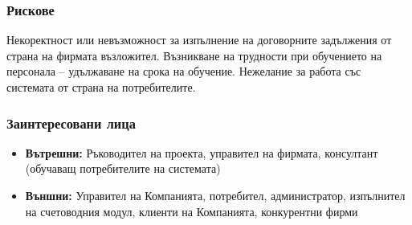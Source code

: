 \documentclass{beamer}
\begin{document}
\begin{frame}
  \frametitle{Рискове}
Некоректност или невъзможност за изпълнение на договорните задължения от страна на фирмата възложител.
Възникване на трудности при обучението на персонала – удължаване на срока на обучение.
Нежелание за работа със системата от страна на потребителите.

\end{frame}


\begin{frame}
  \frametitle{Заинтересовани лица}
\begin{itemize}
 \item \textbf{Вътрешни:}
Ръководител на проекта, управител на фирмата, консултант (обучаващ потребителите на системата)
  \item \textbf{Външни:}
Управител на Компанията, потребител, администратор, изпълнител на счетоводния модул, клиенти на Компанията, конкурентни фирми
\end{itemize}
\end{frame}

\begin{frame}
  \frametitle{}

\end{frame}
\end{document}

